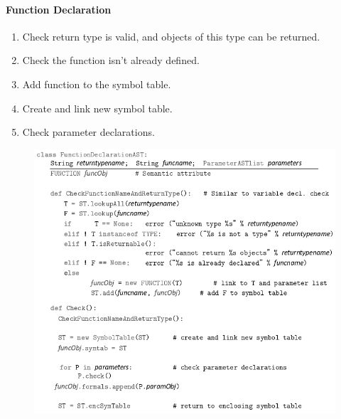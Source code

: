 \documentclass[twocolumn,english]{article}
\begin{document}
\paragraph{Function Declaration}
\begin{enumerate}
\item Check return type is valid, and objects of this type can be returned. 
\item Check the function isn't already defined. 
\item Add function to the symbol table. 
\item Create and link new symbol table. 
\item Check parameter declarations. 
\end{enumerate}
\begin{figure}[H]
\centering{}\includegraphics[width=0.8\linewidth]{img/func-declaration} 
\end{figure}
\end{document}
